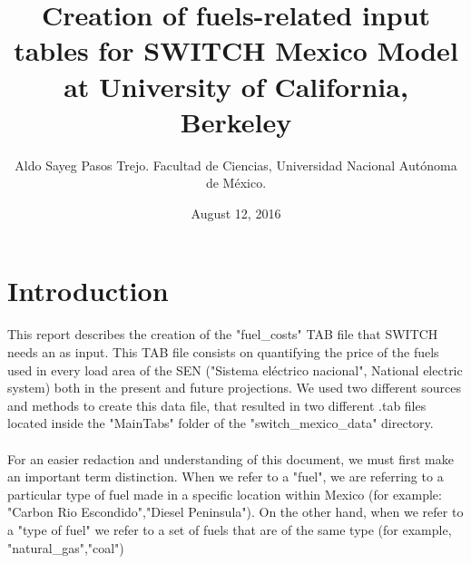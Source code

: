\documentclass{article}
\author{Aldo Sayeg Pasos Trejo. Facultad de Ciencias, Universidad Nacional Autónoma de México.}
\date{August 12, 2016}
\title{Creation of fuels-related input tables for SWITCH Mexico Model at University of California, Berkeley}
\begin{document}
\maketitle
\section{Introduction}
This report describes the creation of the "fuel\_costs" TAB file that SWITCH needs an as input. This TAB file consists on quantifying the price of the fuels used in every load area of the SEN ("Sistema eléctrico nacional", National electric system) both in the present and future projections. We used two different sources and methods to create this data file, that resulted in two different .tab files located inside the "MainTabs" folder of the "switch\_mexico\_data" directory.
\\
\\For an easier redaction and understanding  of this document, we must first make an important term distinction. When we refer to a "fuel", we are referring to a particular type of fuel made in a specific location within Mexico (for example: "Carbon Rio Escondido","Diesel Peninsula"). On the other hand, when we refer to a "type of fuel" we refer to a set of fuels that are of the same type (for example, "natural\_gas","coal")
\end{document}
